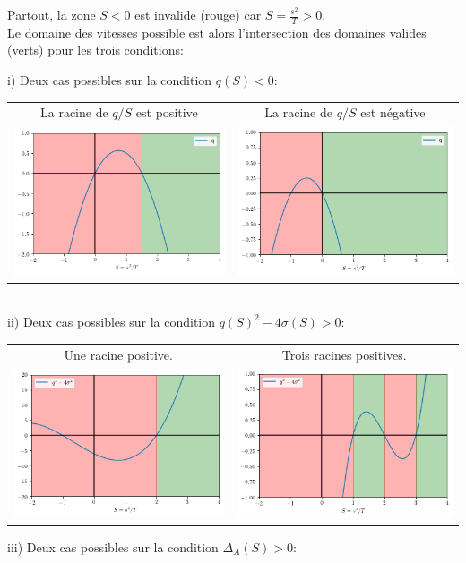 \documentclass[11pt]{article}
\begin{document}
\fi
Partout, la zone $S<0$ est invalide (rouge) car $S=\frac{s^2}{T}>0$.\\
Le domaine des vitesses possible est alors l'intersection des domaines valides (verts) pour les trois conditions:

i) Deux cas possibles sur la condition $q(S)<0$:\\


\begin{tabular}{cc}
 La racine de $q/S$ est positive & La racine de $q/S$ est négative \\
\includegraphics[width=.48\textwidth]{Images/qcas1.png} & \includegraphics[width=.48\textwidth]{Images/qcas2.png} \\
\end{tabular}
\\
ii) Deux cas possibles sur la condition $q(S)^2-4\sigma(S)>0$:\\

\begin{tabular}{cc}
Une racine positive. & Trois racines positives. \\
\includegraphics[width=.48\textwidth]{Images/q2cas1.png} & \includegraphics[width=.48\textwidth]{Images/q2cas2.png} \\
\end{tabular}
iii) Deux cas possibles sur la condition $\Delta_A(S) >0$:\\
\end{document}
